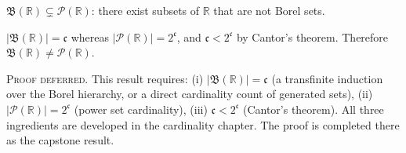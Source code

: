 
\begin{proposition}
\label{prop:borel-not-all-sets}
$\mathfrak{B}(\mathbb{R}) \subsetneq \mathcal{P}(\mathbb{R})$:
there exist subsets of $\mathbb{R}$ that are not Borel sets.
\end{proposition}

\begin{remark*}
$|\mathfrak{B}(\mathbb{R})| = \mathfrak{c}$
whereas $|\mathcal{P}(\mathbb{R})| = 2^{\mathfrak{c}}$,
and $\mathfrak{c} < 2^{\mathfrak{c}}$ by Cantor's theorem.
Therefore $\mathfrak{B}(\mathbb{R})\neq\mathcal{P}(\mathbb{R})$.
\end{remark*}

\begin{remark*}
\textsc{Proof deferred.}  This result requires:
(i) $|\mathfrak{B}(\mathbb{R})| = \mathfrak{c}$
(a transfinite induction over the Borel hierarchy, or a direct
cardinality count of generated sets),
(ii) $|\mathcal{P}(\mathbb{R})| = 2^{\mathfrak{c}}$ (power set cardinality),
(iii) $\mathfrak{c} < 2^{\mathfrak{c}}$ (Cantor's theorem).
All three ingredients are developed in the cardinality chapter.
The proof is completed there as the capstone result.
\end{remark*}

\begin{remark*}[Flash]
\end{remark*}
